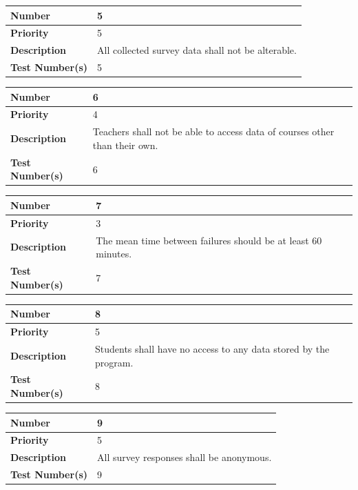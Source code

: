 \documentclass{article}
\begin{document}
\begin{center}
\bigskip
{}
\begin{tabular}{|p{3.5cm}|p{7.5cm}|} 
\hline
\textbf{Number} & 5  \\
\hline
\textbf{Priority} & 5\\ 
\hline
\textbf{Description} & All collected survey data shall not be alterable.\\ 
\hline
\textbf{Test Number(s) }& 5 \\ 
\hline
\end{tabular}


\bigskip
{}
\begin{tabular}{|p{3.5cm}|p{7.5cm}|} 
\hline
\textbf{Number} & 6  \\
\hline
\textbf{Priority} & 4\\ 
\hline
\textbf{Description} & Teachers shall not be able to access data of courses other than their own. \\ 
\hline
\textbf{Test Number(s) }& 6 \\ 
\hline
\end{tabular}


\bigskip
\vspace{1in}
\begin{tabular}{|p{3.5cm}|p{7.5cm}|} 
\hline
\textbf{Number} & 7  \\
\hline
\textbf{Priority} & 3\\ 
\hline
\textbf{Description} & The mean time between failures should be at least 60 minutes. \\ 
\hline
\textbf{Test Number(s) }& 7 \\ 
\hline
\end{tabular}


\bigskip
{}
\begin{tabular}{|p{3.5cm}|p{7.5cm}|} 
\hline
\textbf{Number} & 8  \\
\hline
\textbf{Priority} & 5\\ 
\hline
\textbf{Description} & Students shall have no access to any data stored by the program. \\ 
\hline
\textbf{Test Number(s) }& 8 \\ 
\hline
\end{tabular}


\bigskip
{}
\begin{tabular}{|p{3.5cm}|p{7.5cm}|} 
\hline
\textbf{Number} & 9  \\
\hline
\textbf{Priority} & 5 \\ 
\hline
\textbf{Description} & All survey responses shall be anonymous. \\ 
\hline
\textbf{Test Number(s) }& 9 \\ 
\hline
\end{tabular}



\end{center}
\end{document}
